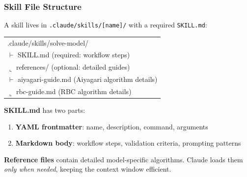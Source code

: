 \documentclass[10pt,english,aspectratio=169]{beamer}
\begin{document}
\begin{frame}
\frametitle{Skill File Structure}

A skill lives in \texttt{.claude/skills/[name]/} with a required \texttt{SKILL.md}:

\vspace{0.3cm}

\begin{center}
\ttfamily
\begin{tabular}{l}
.claude/skills/solve-model/ \\
\quad $\vdash$ SKILL.md \quad\quad\quad\quad\quad\; (required: workflow steps) \\
\quad $\llcorner$ references/ \quad\quad\quad\quad\; (optional: detailed guides) \\
\quad\quad\quad $\vdash$ aiyagari-guide.md \; (Aiyagari algorithm details) \\
\quad\quad\quad $\llcorner$ rbc-guide.md \quad\;\;\; (RBC algorithm details) \\
\end{tabular}
\end{center}

\vspace{0.3cm}

\normalfont
\textbf{SKILL.md} has two parts:
\begin{enumerate}
    \item \textbf{YAML frontmatter}: name, description, command, arguments
    \item \textbf{Markdown body}: workflow steps, validation criteria, prompting patterns
\end{enumerate}

\vspace{0.2cm}

\textbf{Reference files} contain detailed model-specific algorithms. Claude loads them \textit{only when needed}, keeping the context window efficient.
\end{frame}
\end{document}
